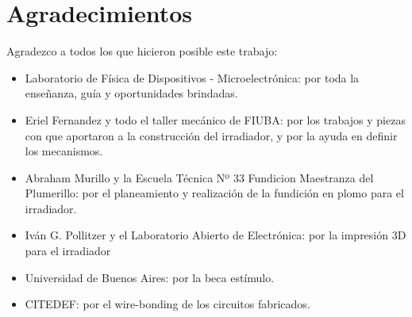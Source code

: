 \clearpage
\part*{Agradecimientos}
Agradezco a todos los que hicieron posible este trabajo:
\begin{itemize}
    \item Laboratorio de Física de Dispositivos - Microelectrónica: 
    por toda la enseñanza, guía y oportunidades brindadas.
    \item Eriel Fernandez y todo el taller mecánico de FIUBA: 
    por los trabajos y piezas con que aportaron a la construcción del
    irradiador, y por la ayuda en definir los mecanismos.
    \item Abraham Murillo y la Escuela Técnica Nº 33 Fundicion Maestranza del 
    Plumerillo:
    por el planeamiento y realización de la fundición en plomo para el
    irradiador.
    \item Iván G. Pollitzer y el Laboratorio Abierto de Electrónica:
    por la impresión 3D para el irradiador
    \item Universidad de Buenos Aires:
    por la beca estímulo.
    \item CITEDEF: por el wire-bonding de los circuitos fabricados.
\end{itemize}
\clearpage
